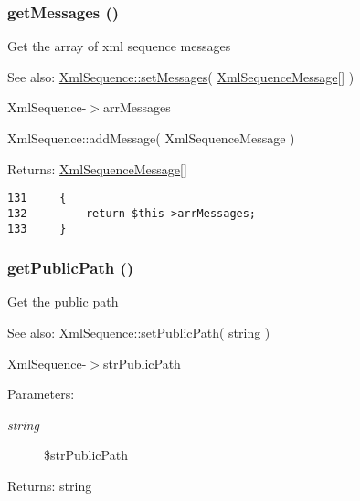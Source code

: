 \hypertarget{class_xml_sequence_7347b0b89cca1d7604e93f5b5e896fc4}{
\subsubsection[{getMessages}]{\setlength{\rightskip}{0pt plus 5cm}getMessages ()}}
\label{class_xml_sequence_7347b0b89cca1d7604e93f5b5e896fc4}


Get the array of xml sequence messages

\begin{Desc}
\item[See also:]\hyperlink{class_xml_sequence_f0c179f1eb00eaaafb9d18f7a330b86f}{XmlSequence::setMessages}( \hyperlink{class_xml_sequence_message}{XmlSequenceMessage}\mbox{[}\mbox{]} ) 

XmlSequence-$>$arrMessages 

XmlSequence::addMessage( XmlSequenceMessage ) \end{Desc}
\begin{Desc}
\item[Returns:]\hyperlink{class_xml_sequence_message}{XmlSequenceMessage}\mbox{[}\mbox{]} \end{Desc}


\begin{Code}\begin{verbatim}131     {
132         return $this->arrMessages;
133     }
\end{verbatim}
\end{Code}


\hypertarget{class_xml_sequence_74df99a19bc54d630a15e1778144eb31}{
\subsubsection[{getPublicPath}]{\setlength{\rightskip}{0pt plus 5cm}getPublicPath ()}}
\label{class_xml_sequence_74df99a19bc54d630a15e1778144eb31}


Get the \hyperlink{namespacepublic}{public} path

\begin{Desc}
\item[See also:]XmlSequence::setPublicPath( string ) 

XmlSequence-$>$strPublicPath \end{Desc}
\begin{Desc}
\item[Parameters:]
\begin{description}
\item[{\em string}]\$strPublicPath \end{description}
\end{Desc}
\begin{Desc}
\item[Returns:]string \end{Desc}


